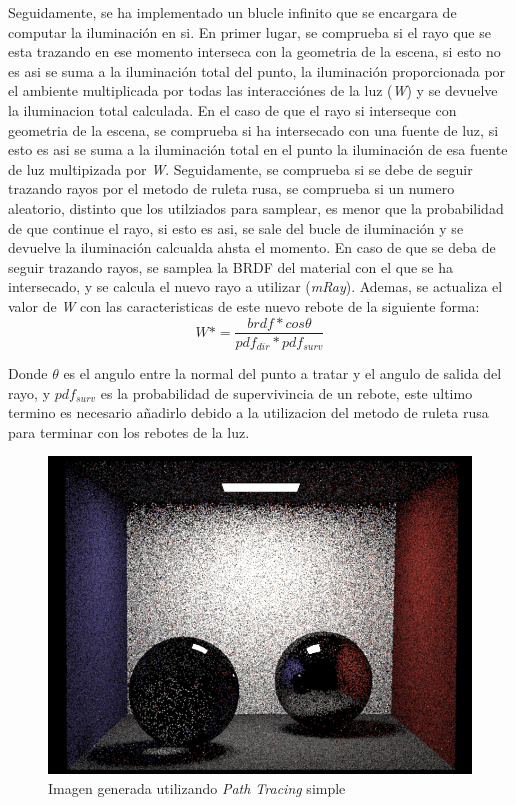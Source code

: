 \documentclass[10pt,oneside,a4paper]{article}
\begin{document}
Seguidamente, se ha implementado un blucle infinito que se encargara de computar la iluminación en si. En primer lugar, se comprueba si el rayo que se esta trazando en ese momento interseca con la geometria de la escena, si esto no es asi se suma a la iluminación total del punto, la iluminación proporcionada por el ambiente multiplicada por todas las interacciónes de la luz (\textit{W}) y se devuelve la iluminacion total calculada. En el caso de que el rayo si interseque con geometria de la escena, se comprueba si ha intersecado con una fuente de luz, si esto es asi se suma a la iluminación total en el punto la iluminación de esa fuente de luz multipizada por \textit{W}. Seguidamente, se comprueba si se debe de seguir trazando rayos por el metodo de ruleta rusa, se comprueba si un numero aleatorio, distinto que los utilziados para samplear, es menor que la probabilidad de que continue el rayo, si esto es asi, se sale del bucle de iluminación y se devuelve la iluminación calcualda ahsta el momento. En caso de que se deba de seguir trazando rayos, se samplea la BRDF del  material con el que se ha intersecado, y se calcula el nuevo rayo a utilizar (\textit{mRay}). Ademas, se actualiza el valor de \textit{W} con las caracteristicas de este nuevo rebote de la siguiente forma:
$$W *= \frac{brdf * cos\theta}{pdf_{dir} * pdf_{surv}}$$

Donde $\theta$ es el angulo entre la normal del punto a tratar y el angulo de salida del rayo, y $pdf_{surv}$ es la probabilidad de supervivincia de un rebote, este ultimo termino es necesario añadirlo debido a la utilizacion del metodo de ruleta rusa para terminar con los rebotes de la luz.

\begin{figure}[h]
\centering
\includegraphics[width=.6\linewidth]{images/cbox_path_512.png}
\caption{Imagen generada utilizando \textit{Path Tracing} simple}
\label{fig:disp}
\end{figure}
\end{document}
